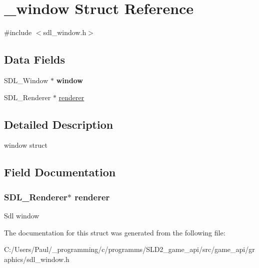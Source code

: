 \hypertarget{struct__window}{\section{\+\_\+window Struct Reference}
\label{struct__window}
}


{\ttfamily \#include $<$sdl\+\_\+window.\+h$>$}

\subsection*{Data Fields}
\begin{DoxyCompactItemize}
\item 
\hypertarget{struct__window_aaa8e409e04dcf575ef63fd5fb3db06f9}{S\+D\+L\+\_\+\+Window $\ast$ {\bfseries window}}\label{struct__window_aaa8e409e04dcf575ef63fd5fb3db06f9}

\item 
S\+D\+L\+\_\+\+Renderer $\ast$ \hyperlink{struct__window_a966da7a60c4ea3ba301e26ccc5efe452}{renderer}
\end{DoxyCompactItemize}


\subsection{Detailed Description}
window struct 

\subsection{Field Documentation}
\hypertarget{struct__window_a966da7a60c4ea3ba301e26ccc5efe452}{
\subsubsection[{renderer}]{\setlength{\rightskip}{0pt plus 5cm}S\+D\+L\+\_\+\+Renderer$\ast$ renderer}}\label{struct__window_a966da7a60c4ea3ba301e26ccc5efe452}
Sdl window 

The documentation for this struct was generated from the following file\+:\begin{DoxyCompactItemize}
\item 
C\+:/\+Users/\+Paul/\+\_\+programming/c/programms/\+S\+L\+D2\+\_\+game\+\_\+api/src/game\+\_\+api/graphics/sdl\+\_\+window.\+h\end{DoxyCompactItemize}
